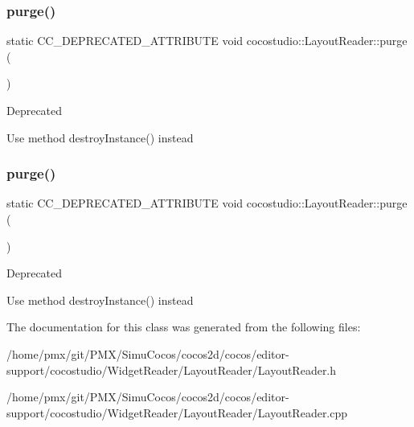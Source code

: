 \subsubsection{\texorpdfstring{purge()}{purge()}\hspace{0.1cm}{\footnotesize\ttfamily [1/2]}}
{\footnotesize\ttfamily static C\+C\+\_\+\+D\+E\+P\+R\+E\+C\+A\+T\+E\+D\+\_\+\+A\+T\+T\+R\+I\+B\+U\+TE void cocostudio\+::\+Layout\+Reader\+::purge (\begin{DoxyParamCaption}{ }\end{DoxyParamCaption})\hspace{0.3cm}{\ttfamily [static]}}

\begin{DoxyRefDesc}{Deprecated}
\item[\hyperlink{deprecated__deprecated000090}{Deprecated}]Use method destroy\+Instance() instead \end{DoxyRefDesc}
\mbox{\label{classcocostudio_1_1LayoutReader_ac1956c12637af4eb76d5c70f5b6ea857}} 
\subsubsection{\texorpdfstring{purge()}{purge()}\hspace{0.1cm}{\footnotesize\ttfamily [2/2]}}
{\footnotesize\ttfamily static C\+C\+\_\+\+D\+E\+P\+R\+E\+C\+A\+T\+E\+D\+\_\+\+A\+T\+T\+R\+I\+B\+U\+TE void cocostudio\+::\+Layout\+Reader\+::purge (\begin{DoxyParamCaption}{ }\end{DoxyParamCaption})\hspace{0.3cm}{\ttfamily [static]}}

\begin{DoxyRefDesc}{Deprecated}
\item[\hyperlink{deprecated__deprecated000325}{Deprecated}]Use method destroy\+Instance() instead \end{DoxyRefDesc}


The documentation for this class was generated from the following files\+:\begin{DoxyCompactItemize}
\item 
/home/pmx/git/\+P\+M\+X/\+Simu\+Cocos/cocos2d/cocos/editor-\/support/cocostudio/\+Widget\+Reader/\+Layout\+Reader/Layout\+Reader.\+h\item 
/home/pmx/git/\+P\+M\+X/\+Simu\+Cocos/cocos2d/cocos/editor-\/support/cocostudio/\+Widget\+Reader/\+Layout\+Reader/Layout\+Reader.\+cpp\end{DoxyCompactItemize}
